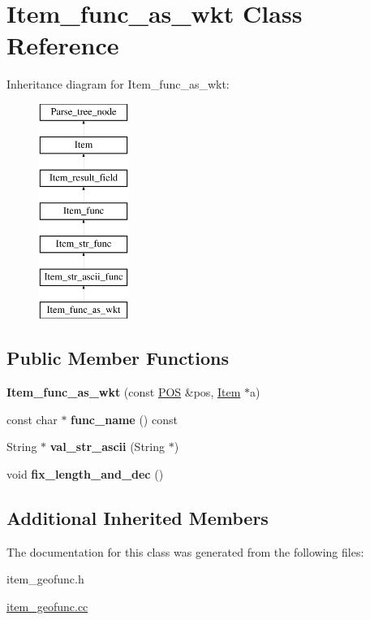 \hypertarget{classItem__func__as__wkt}{}\section{Item\+\_\+func\+\_\+as\+\_\+wkt Class Reference}
\label{classItem__func__as__wkt}
Inheritance diagram for Item\+\_\+func\+\_\+as\+\_\+wkt\+:\begin{figure}[H]
\begin{center}
\leavevmode
\includegraphics[height=7.000000cm]{classItem__func__as__wkt}
\end{center}
\end{figure}
\subsection*{Public Member Functions}
\begin{DoxyCompactItemize}
\item 
\mbox{\label{classItem__func__as__wkt_ab2a10f5ff5d71c93a96c7ce5f797a4cb}} 
{\bfseries Item\+\_\+func\+\_\+as\+\_\+wkt} (const \mbox{\hyperlink{structYYLTYPE}{P\+OS}} \&pos, \mbox{\hyperlink{classItem}{Item}} $\ast$a)
\item 
\mbox{\label{classItem__func__as__wkt_a57e379704cc64528789b838de79c293a}} 
const char $\ast$ {\bfseries func\+\_\+name} () const
\item 
\mbox{\label{classItem__func__as__wkt_a42fa647380b2017e0b1a409940fe0b05}} 
String $\ast$ {\bfseries val\+\_\+str\+\_\+ascii} (String $\ast$)
\item 
\mbox{\label{classItem__func__as__wkt_a17029864b2e04e2a7b6914da681f06b6}} 
void {\bfseries fix\+\_\+length\+\_\+and\+\_\+dec} ()
\end{DoxyCompactItemize}
\subsection*{Additional Inherited Members}


The documentation for this class was generated from the following files\+:\begin{DoxyCompactItemize}
\item 
item\+\_\+geofunc.\+h\item 
\mbox{\hyperlink{item__geofunc_8cc}{item\+\_\+geofunc.\+cc}}\end{DoxyCompactItemize}
